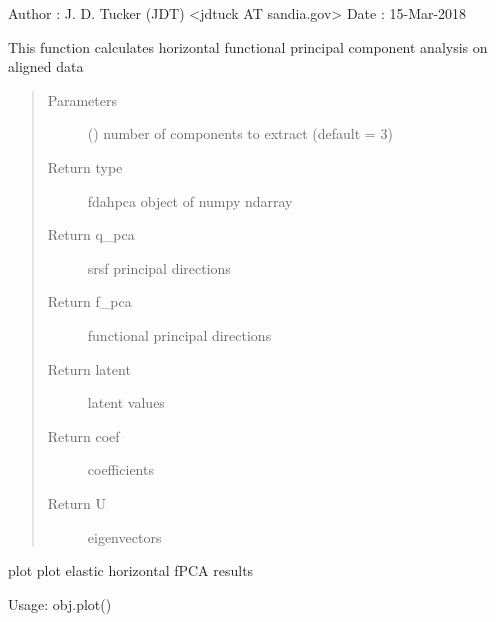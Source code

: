 \documentclass[letterpaper,10pt,english]{sphinxmanual}
\begin{document}
\begin{fulllineitems}
Author :  J. D. Tucker (JDT) \textless{}jdtuck AT sandia.gov\textgreater{}
Date   :  15-Mar-2018

\begin{fulllineitems}
\label{\detokenize{fPCA:fPCA.fdahpca.calc_fpca}}
This function calculates horizontal functional principal component analysis on aligned data
\begin{quote}\begin{description}
\item[{Parameters}] \leavevmode
{} () \textendash{} number of components to extract (default = 3)

\item[{Return type}] \leavevmode
fdahpca object of numpy ndarray

\item[{Return q\_pca}] \leavevmode
srsf principal directions

\item[{Return f\_pca}] \leavevmode
functional principal directions

\item[{Return latent}] \leavevmode
latent values

\item[{Return coef}] \leavevmode
coefficients

\item[{Return U}] \leavevmode
eigenvectors

\end{description}\end{quote}

\end{fulllineitems}


\begin{fulllineitems}
\label{\detokenize{fPCA:fPCA.fdahpca.plot}}
plot plot elastic horizontal fPCA results

Usage: obj.plot()

\end{fulllineitems}


\end{fulllineitems}
\end{document}
